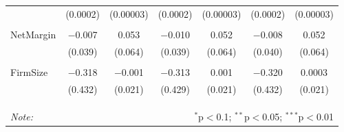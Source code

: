\documentclass[]{article}
\begin{document}
\begin{table}[h]
\begin{tabular}{@{\extracolsep{1pt}}lcccccc}
  & (0.0002) & (0.00003) & (0.0002) & (0.00003) & (0.0002) & (0.00003) \\ 
  & & & & & & \\ 
 NetMargin & $-$0.007 & 0.053 & $-$0.010 & 0.052 & $-$0.008 & 0.052 \\ 
  & (0.039) & (0.064) & (0.039) & (0.064) & (0.040) & (0.064) \\ 
  & & & & & & \\ 
 FirmSize & $-$0.318 & $-$0.001 & $-$0.313 & 0.001 & $-$0.320 & 0.0003 \\ 
  & (0.432) & (0.021) & (0.429) & (0.021) & (0.432) & (0.021) \\ 
  & & & & & & \\ 
\hline \\[-1.8ex] 
\hline 
\hline \\[-1.8ex] 
\textit{Note:}  & \multicolumn{6}{r}{$^{*}$p$<$0.1; $^{**}$p$<$0.05; $^{***}$p$<$0.01} \\ 
\end{tabular} 
\end{table}
\end{document}
